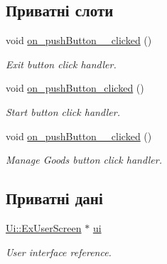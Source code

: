 \subsection*{Приватні слоти}
\begin{DoxyCompactItemize}
\item 
\hypertarget{classExUserScreen_a30a26ad349a33bac86a0848934c55655}{void \hyperlink{classExUserScreen_a30a26ad349a33bac86a0848934c55655}{on\-\_\-push\-Button\-\_\-\_\-clicked} ()}\label{classExUserScreen_a30a26ad349a33bac86a0848934c55655}

\begin{DoxyCompactList}\small\item\em Exit button click handler. \end{DoxyCompactList}\item 
\hypertarget{classExUserScreen_a4c7d4f567fc5d87bf459c4fe9ae09411}{void \hyperlink{classExUserScreen_a4c7d4f567fc5d87bf459c4fe9ae09411}{on\-\_\-push\-Button\-\_\-clicked} ()}\label{classExUserScreen_a4c7d4f567fc5d87bf459c4fe9ae09411}

\begin{DoxyCompactList}\small\item\em Start button click handler. \end{DoxyCompactList}\item 
\hypertarget{classExUserScreen_ad5eeeac687e031eb0b722957b20191cf}{void \hyperlink{classExUserScreen_ad5eeeac687e031eb0b722957b20191cf}{on\-\_\-push\-Button\-\_\-\_\-clicked} ()}\label{classExUserScreen_ad5eeeac687e031eb0b722957b20191cf}

\begin{DoxyCompactList}\small\item\em Manage Goods button click handler. \end{DoxyCompactList}\end{DoxyCompactItemize}
\subsection*{Приватні дані}
\begin{DoxyCompactItemize}
\item 
\hypertarget{classExUserScreen_abed6a95638d506058d3b1e6e69a42788}{\hyperlink{classUi_1_1ExUserScreen}{Ui\-::\-Ex\-User\-Screen} $\ast$ \hyperlink{classExUserScreen_abed6a95638d506058d3b1e6e69a42788}{ui}}\label{classExUserScreen_abed6a95638d506058d3b1e6e69a42788}

\begin{DoxyCompactList}\small\item\em User interface reference. \end{DoxyCompactList}\end{DoxyCompactItemize}


